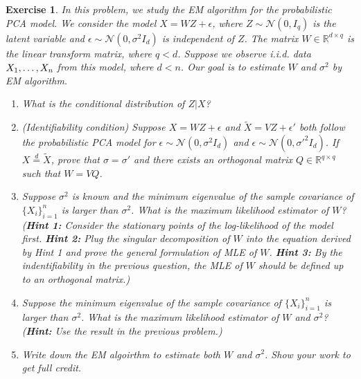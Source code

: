 \documentclass[12pt]{article}
\theoremstyle{colon}
\newtheorem{exercise}{Exercise}
\begin{document}
\begin{exercise}
  In this problem, we study the EM algorithm for the probabilistic PCA model. We consider the model $X = WZ + \epsilon$, where $Z \sim \mathcal{N}(0, I_q)$ is the latent variable and $\epsilon \sim \mathcal{N}(0, \sigma^2 I_d)$ is independent of $Z$. The matrix $W \in \mathbb{R}^{d \times q}$ is the linear transform matrix, where $q < d$. Suppose we observe i.i.d. data $X_1, \mathellipsis, X_n$ from this model, where $d < n$. Our goal is to estimate $W$ and $\sigma^2$ by EM algorithm.
  \begin{enumerate}[label=\arabic*)]
    \item What is the conditional distribution of $Z | X$?
    \item (Identifiability condition) Suppose $X = WZ + \epsilon$ and $\tilde{X} = VZ + \epsilon'$ both follow the probabilistic PCA model for $\epsilon \sim \mathcal{N}(0, \sigma^2 I_d)$ and $\epsilon \sim \mathcal{N}(0, \sigma'^2 I_d)$. If $X \stackrel{d}{=} \tilde{X}$, prove that $\sigma = \sigma'$ and there exists an orthogonal matrix $Q \in \mathbb{R}^{q \times q}$ such that $W = VQ$.
    \item Suppose $\sigma^2$ is known and the minimum eigenvalue of the sample covariance of $\{ X_i \}_{i=1}^n$ is larger than $\sigma^2$. What is the maximum likelihood estimator of $W$? (\textbf{Hint 1:} Consider the stationary points of the log-likelihood of the model first. \textbf{Hint 2:} Plug the singular decomposition of $W$ into the equation derived by Hint 1 and prove the general formulation of MLE of $W$. \textbf{Hint 3:} By the indentifiability in the previous question, the MLE of $W$ should be defined up to an orthogonal matrix.)
    \item Suppose the minimum eigenvalue of the sample covariance of $\{ X_i \}_{i=1}^n$ is larger than $\sigma^2$. What is the maximum likelihood estimator of $W$ and $\sigma^2$? (\textbf{Hint:} Use the result in the previous problem.)
    \item Write down the EM algoirthm to estimate both $W$ and $\sigma^2$. Show your work to get full credit.
  \end{enumerate}
\end{exercise}
\end{document}
